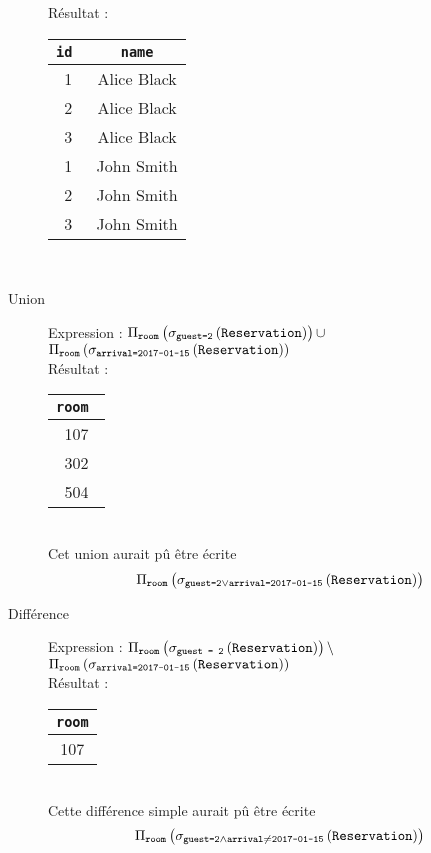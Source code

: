 \documentclass{cours}
\begin{document}
\begin{description}
    Résultat : \begin{tabular}{cc}
        \toprule
        \tt id & \tt name\\
        \midrule
        1 & Alice Black \\
        2 & Alice Black \\
        3 & Alice Black \\
        1 & John Smith \\
        2 & John Smith\\
        3 & John Smith\\
        \bottomrule
    \end{tabular}\\
    \item[Union]  Expression : $\Pi_{\texttt{room}}\left(\sigma_{\texttt{guest=2}}\left(\texttt{Reservation}\right)\right) \cup$\\
    $\Pi_{\texttt{room}}\left(\sigma_{\texttt{arrival=2017-01-15}}\left(\texttt{Reservation}\right)\right)$\\
    Résultat : 
    \begin{tabular}{c}
        \toprule
        \tt room \\
        \midrule 
        107\\
        302\\
        504\\
        \bottomrule
    \end{tabular}\\
    Cet union aurait pû être écrite 
    \[
        \Pi_{\texttt{room}}\left(\sigma_{\texttt{guest=2}\lor\texttt{arrival=2017-01-15}}\left(\texttt{Reservation}\right)\right)
    \]
    \item[Différence] Expression : $\Pi_{\texttt{room}}\left(\sigma_{\texttt{guest = 2}}\left(\texttt{Reservation}\right)\right)\setminus$\\
    $\Pi_{\texttt{room}}\left(\sigma_{\texttt{arrival=2017-01-15}}\left(\texttt{Reservation}\right)\right)$\\
    Résultat : \begin{tabular}{c}
        \toprule
        \tt room\\
        \midrule
        107\\
        \bottomrule
    \end{tabular}\\
    Cette différence simple aurait pû être écrite 
    \[
        \Pi_{\texttt{room}}\left(\sigma_{\texttt{guest=2}\land\texttt{arrival}\neq\texttt{2017-01-15}}\left(\texttt{Reservation}\right)\right)    
    \]


\end{description}
\end{document}
